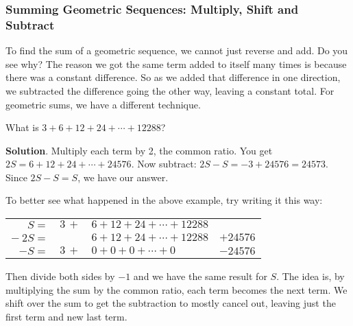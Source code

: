 \documentclass[11pt,]{book}
\theoremstyle{ptxplainnotitle}
\theoremstyle{ptxplaintitle}
\theoremstyle{ptxdefinitionnotitle}
\theoremstyle{ptxdefinitiontitle}
\theoremstyle{ptxdefinitionnotitle}
\theoremstyle{ptxdefinitiontitle}
\theoremstyle{ptxdefinitionnotitle}
\theoremstyle{ptxdefinitiontitle}
\theoremstyle{ptxdefinitiontitlenonumber}
\theoremstyle{ptxdefinitiontitlenonumber}
\numberwithin{equation}{chapter}
\newcommand{\hrulethin}  {\noalign{\hrule height 0.04em}}
\begin{document}
\subsubsection[{Summing Geometric Sequences: Multiply, Shift and Subtract}]{Summing Geometric Sequences: Multiply, Shift and Subtract}\label{subsubsection-2}
\hypertarget{p-208}{}%
To find the sum of a geometric sequence, we cannot just reverse and add. Do you see why? The reason we got the same term added to itself many times is because there was a constant difference. So as we added that difference in one direction, we subtracted the difference going the other way, leaving a constant total. For geometric sums, we have a different technique.%
\begin{example}\label{example-10}
\hypertarget{p-209}{}%
What is \(3 + 6 + 12 + 24 + \cdots + 12288\)?%
\par\smallskip%
\noindent\textbf{Solution}.\hypertarget{solution-18}{}\quad%
\hypertarget{p-210}{}%
Multiply each term by 2, the common ratio. You get \(2S = 6 + 12 + 24 + \cdots + 24576\). Now subtract: \(2S - S = -3 + 24576 = 24573\). Since \(2S - S = S\), we have our answer.%
\end{example}
\hypertarget{p-211}{}%
To better see what happened in the above example, try writing it this way:%
\begin{sidebyside}{1}{0}{0}{0}
\begin{sbspanel}{1}
{\centering%
\begin{tabular}{rlll}
\(S=\)&\(3 \, +\)&\(6 + 12 + 24 + \cdots + 12288\)&\tabularnewline[0pt]
\(-~2S=\)&&\(6 + 12 + 24 + \cdots + 12288\)&\(+ 24576\)\tabularnewline\hrulethin
\(-S = \)&\(3 \, +\)&\(0 + 0 + 0 +  \cdots + 0 \)&\(-24576\)
\end{tabular}
\par}
\end{sbspanel}
\end{sidebyside}
\par
\hypertarget{p-212}{}%
Then divide both sides by \(-1\) and we have the same result for \(S\). The idea is, by multiplying the sum by the common ratio, each term becomes the next term. We shift over the sum to get the subtraction to mostly cancel out, leaving just the first term and new last term.%
\end{document}
